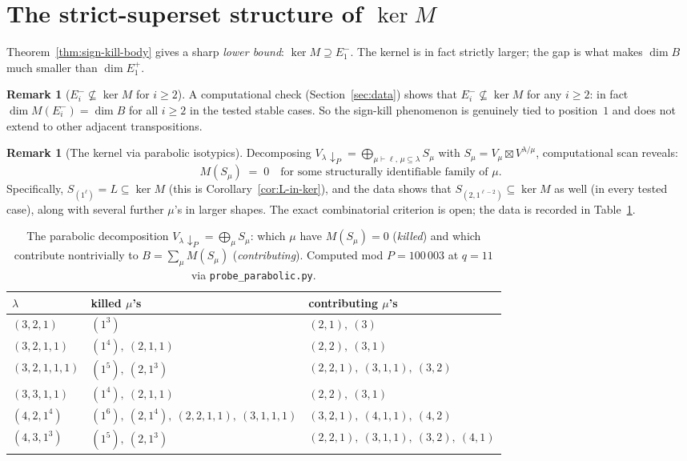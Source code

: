 \documentclass[11pt]{article}
\theoremstyle{definition}
\newtheorem{remark}[theorem]{Remark}
\begin{document}
\section{The strict-superset structure of $\ker M$}
\label{sec:ker-structure}

Theorem~\ref{thm:sign-kill-body} gives a sharp \emph{lower bound}:
$\ker M \supseteq E_1^-$. The kernel is in fact strictly larger;
the gap is what makes $\dim B$ much smaller than $\dim E_1^+$.

\begin{remark}[$E_i^- \not\subseteq \ker M$ for $i \ge 2$]
\label{rem:Ei-not-killed}
A computational check (Section~\ref{sec:data}) shows that
$E_i^- \not\subseteq \ker M$ for any $i \ge 2$: in fact
$\dim M(E_i^-) = \dim B$ for all $i \ge 2$ in the tested stable
cases. So the sign-kill phenomenon is genuinely tied to position~$1$
and does not extend to other adjacent transpositions.
\end{remark}

\begin{remark}[The kernel via parabolic isotypics]
\label{rem:para-kernel}
Decomposing $V_\lambda \!\downarrow_P = \bigoplus_{\mu \vdash \ell,\,
\mu \subseteq \lambda} S_\mu$ with $S_\mu = V_\mu \boxtimes V^{\lambda/\mu}$,
computational scan reveals:
\[
   M(S_\mu) \;=\; 0 \quad\text{for some structurally identifiable family of }\mu.
\]
Specifically, $S_{(1^\ell)} = L \subseteq \ker M$ (this is
Corollary~\ref{cor:L-in-ker}), and the data shows that
$S_{(2, 1^{\ell-2})} \subseteq \ker M$ as well (in every tested case),
along with several further $\mu$'s in larger shapes. The exact
combinatorial criterion is open; the data is recorded in
Table~\ref{tab:para-data}.
\end{remark}

\begin{table}[t]
\centering
\renewcommand{\arraystretch}{1.15}
\begin{tabular}{l|l|l}
\toprule
$\lambda$ & killed $\mu$'s & contributing $\mu$'s \\
\midrule
$(3, 2, 1)$         & $(1^3)$                                & $(2, 1),\ (3)$ \\
$(3, 2, 1, 1)$      & $(1^4),\ (2, 1, 1)$                    & $(2, 2),\ (3, 1)$ \\
$(3, 2, 1, 1, 1)$   & $(1^5),\ (2, 1^3)$                     & $(2, 2, 1),\ (3, 1, 1),\ (3, 2)$ \\
$(3, 3, 1, 1)$      & $(1^4),\ (2, 1, 1)$                    & $(2, 2),\ (3, 1)$ \\
$(4, 2, 1^4)$       & $(1^6),\ (2, 1^4),\ (2, 2, 1, 1),\ (3, 1, 1, 1)$ & $(3, 2, 1),\ (4, 1, 1),\ (4, 2)$ \\
$(4, 3, 1^3)$       & $(1^5),\ (2, 1^3)$                     & $(2, 2, 1),\ (3, 1, 1),\ (3, 2),\ (4, 1)$ \\
\bottomrule
\end{tabular}
\caption{The parabolic decomposition $V_\lambda \!\downarrow_P = \bigoplus_\mu S_\mu$:
which $\mu$ have $M(S_\mu) = 0$ (\emph{killed}) and which contribute
nontrivially to $B = \sum_\mu M(S_\mu)$ (\emph{contributing}). Computed
mod $P = 100\,003$ at $q = 11$ via
\texttt{probe\_parabolic.py}.}
\label{tab:para-data}
\end{table}
\end{document}
